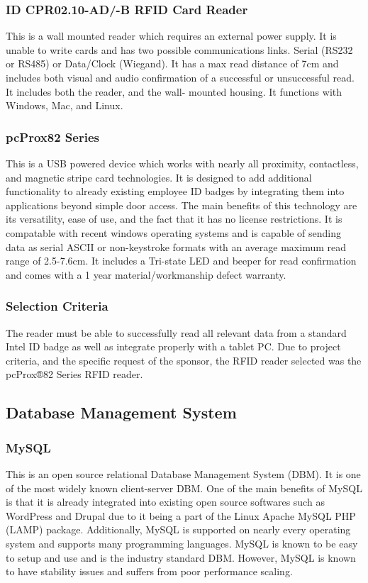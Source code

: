 \documentclass[10pt, onecolumn, twoside, peerreview]{IEEEtran}
\begin{document}
\subsubsection{ID CPR02.10-AD/-B RFID Card Reader}
This is a wall mounted reader which requires an external power supply. It is unable to write cards and has two possible
communications links. Serial (RS232 or RS485) or Data/Clock (Wiegand). It has a max read distance of 7cm and includes
both visual and audio confirmation of a successful or unsuccessful read. It includes both the reader, and the wall-
mounted housing. It functions with Windows, Mac, and Linux.\\


\subsubsection{pcProx82 Series}
This is a USB powered device which works with nearly all proximity, contactless, and magnetic stripe card technologies.
It is designed to add additional functionality to already existing employee ID badges by integrating them into
applications beyond simple door access. The main benefits of this technology are its versatility, ease of use, and the
fact that it has no license restrictions. It is compatable with recent windows operating systems and is capable of
sending data as serial ASCII or non-keystroke formats with an average maximum read range of 2.5-7.6cm. It includes a
Tri-state LED and beeper for read confirmation and comes with a 1 year material/workmanship defect warranty.\\

\subsubsection{Selection Criteria}
The reader must be able to successfully read all relevant data from a standard Intel ID badge as well as integrate
properly with a tablet PC. Due to project criteria, and the specific request of the sponsor, the RFID reader selected
was the pcProx®82 Series RFID reader.

\subsection{Database Management System}
\subsubsection{MySQL}
This is an open source relational Database Management System (DBM). It is one of the most widely known client-server
DBM. One of the main benefits of MySQL is that it is already integrated into existing open source softwares such as
WordPress and Drupal due to it being a part of the Linux Apache MySQL PHP (LAMP) package. Additionally, MySQL is
supported on nearly every operating system and supports many programming languages. MySQL is known to be easy to setup
and use and is the industry standard DBM. However, MySQL is known to have stability issues and suffers from poor
performance scaling.\\
\end{document}
